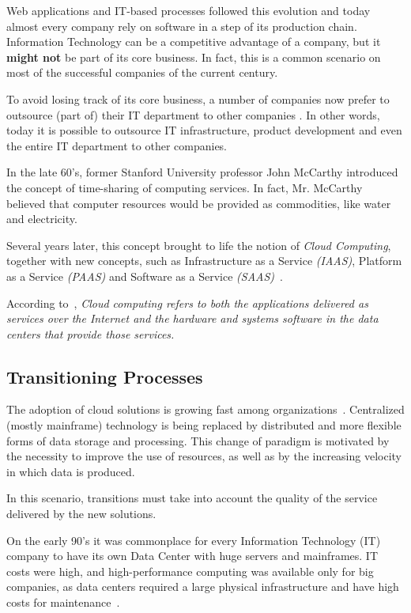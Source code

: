 \documentclass{article}
\begin{document}
Web applications and IT-based processes followed this evolution and today almost every company rely on software in a step of its production chain. Information Technology can be a competitive advantage of a company, but it \textbf{might not}  be part of its core business\cite{powell1997information}. In fact, this is a common scenario on most of the successful companies of the current century.

To avoid losing track of its core business, a number of companies now prefer to outsource (part of) their IT department to other companies \cite{quinn2013technology}. In other words, today it is possible to outsource IT infrastructure, product development and even the entire IT department to other companies.

In the late 60's, former Stanford University professor John McCarthy \cite{DBLP:journals/cacm/McCarthy67} introduced the concept of time-sharing of computing services. In fact, Mr. McCarthy believed that computer resources would be provided as commodities, like water and electricity. 

Several years later, this concept brought to life the notion of \textit{Cloud Computing}, together with new concepts, such as Infrastructure as a Service \textit{(IAAS)}, Platform as a Service \textit{(PAAS)} and Software as a Service \textit{(SAAS)}~\cite{AViewOfCloudComputing}.

According to~\cite{AViewOfCloudComputing}, \textit{Cloud computing refers to both the applications delivered as services over the Internet and the hardware and systems software in the data centers that provide those services.} 

\subsection{Transitioning Processes}
The adoption of cloud solutions is growing fast among organizations~\cite{6546068}.
Centralized (mostly mainframe) technology is being replaced by distributed and more flexible forms of data storage and processing.
This change of paradigm is motivated by the necessity to improve the use of resources, as well as by the increasing velocity in which data is produced.

In this scenario, transitions must take into account the quality of the service delivered by the new solutions.

On the early 90's it was commonplace for every Information Technology (IT) company to have its own Data Center with huge servers and mainframes. 
IT costs were high, and high-performance computing was available only for big companies, as data centers required a large physical infrastructure and have high costs for maintenance~\cite{Armbrust09m.:above}.
\end{document}
